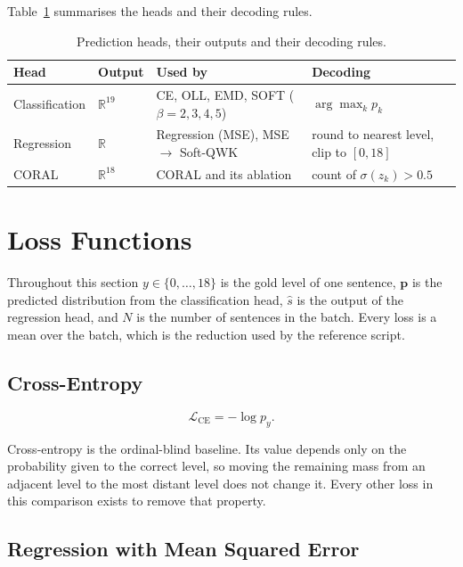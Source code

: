 Table~\ref{tab:meth-heads} summarises the heads and their decoding rules.

\begin{table}[H]
\centering
\footnotesize
\caption{Prediction heads, their outputs and their decoding rules.}
\label{tab:meth-heads}
\begin{tabular}{p{2.3cm} p{1.5cm} p{3.9cm} p{3.3cm}}
\toprule
\textbf{Head} & \textbf{Output} & \textbf{Used by} & \textbf{Decoding} \\
\midrule
Classification & $\mathbb{R}^{19}$ & CE, OLL, EMD, SOFT ($\beta=2,3,4,5$) &
$\arg\max_k p_k$ \\
Regression & $\mathbb{R}$ & Regression (MSE), MSE $\rightarrow$ Soft-QWK &
round to nearest level, clip to $[0,18]$ \\
CORAL & $\mathbb{R}^{18}$ & CORAL and its ablation &
count of $\sigma(z_k) > 0.5$ \\
\bottomrule
\end{tabular}
\end{table}

\section{Loss Functions}
\label{sec:meth-losses}

Throughout this section $y\in\{0,\dots,18\}$ is the gold level of one sentence, $\mathbf{p}$ is
the predicted distribution from the classification head, $\hat{s}$ is the output of the
regression head, and $N$ is the number of sentences in the batch. Every loss is a mean over the
batch, which is the reduction used by the reference script.

\subsection{Cross-Entropy}

\begin{equation}
\mathcal{L}_{\text{CE}} = -\log p_y .
\end{equation}

Cross-entropy is the ordinal-blind baseline. Its value depends only on the probability given to
the correct level, so moving the remaining mass from an adjacent level to the most distant
level does not change it. Every other loss in this comparison exists to remove that property.

\subsection{Regression with Mean Squared Error}

